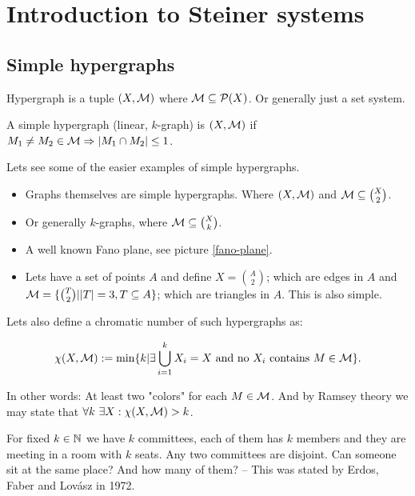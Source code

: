 \chapter{Introduction to Steiner systems}

\section{Simple hypergraphs}

\begin{defn}
	Hypergraph is a tuple $(X, \mathcal{M})$ where $\mathcal{M} \subseteq \mathcal{P}(X)$. Or generally just a set system.
\end{defn}

\begin{defn}
	A simple hypergraph (linear, $k$-graph) is $(X,\mathcal{M})$ if $M_1 \neq M_2 \in \mathcal{M} \Rightarrow |M_1 \cap M_2| \leq 1$.
\end{defn}

\begin{example}
	Lets see some of the easier examples of simple hypergraphs.
	
	\begin{itemize}
		\item Graphs themselves are simple hypergraphs. Where $(X, \mathcal{M})$ and $\mathcal{M} \subseteq \binom{X}{2}$.
		\item Or generally $k$-graphs, where $\mathcal{M} \subseteq \binom{X}{k}$.
		\item A well known Fano plane, see picture \ref{fano-plane}.
		\item Lets have a set of points $A$ and define $X = \binom{A}{2}$; which are edges in $A$ and $\mathcal{M} = \{\binom{T}{2} | |T| = 3, T \subseteq A\}$; which are triangles in $A$. This is also simple.
	\end{itemize}
\end{example}

Lets also define a chromatic number of such hypergraphs as:

$$
\chi (X,\mathcal{M}) := \min \{k | \exists \bigcup_{i=1}^k X_i = X \text{ and no } X_i \text{ contains } M \in \mathcal{M}\}.
$$

\noindent In other words: At least two "colors" for each $M \in \mathcal{M}$. And by Ramsey theory we may state that $\forall k \ \exists X: \chi(X,\mathcal{M}) > k$.

\begin{example}
	For fixed $k \in \mathbb{N}$ we have $k$ committees, each of them has $k$ members and they are meeting in a room with $k$ seats. Any two committees are disjoint. Can someone sit at the same place? And how many of them? -- This was stated by Erdos, Faber and Lovász in 1972.
\end{example}

